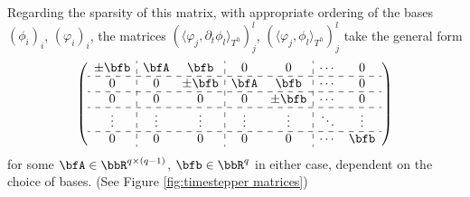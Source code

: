 \begin{example}
        Regarding the sparsity of this matrix, with appropriate ordering of the bases $(\phi_{i})_{i}$, $(\varphi_{i})_{i}$, the matrices $(\langle\varphi_{j}, \partial_{t}\phi_{l}\rangle_{T^{h}})_{j}^{l}$, $(\langle\varphi_{j}, \phi_{l}\rangle_{T^{h}})_{j}^{l}$ take the general form
        \begin{equation}\label{eqn:timestepper matrices}
            \left(\begin{array}{ c : c c : c c : c c }
                \pm\bfb  &  \bfA    &  \bfb     &  0       &  0        &  \cdots   &  0        \\
                \hdashline
                0        &  0       &  \pm\bfb  &  \bfA    &  \bfb     &  \cdots   &  0        \\
                \hdashline
                0        &  0       &  0        &  0       &  \pm\bfb  &  \cdots   &  0        \\
                \hdashline
                \vdots   &  \vdots  &  \vdots   &  \vdots  &  \vdots   &  \ddots   &  \vdots   \\
                \hdashline
                0        &  0       &  0        &  0       &  0        &  \cdots   &  \bfb     \\
            \end{array}\right)
        \end{equation}
        for some $\bfA  \in  \bbR^{q\times (q - 1)}$, $\bfb  \in  \bbR^{q}$ in either case, dependent on the choice of bases. (See Figure \ref{fig:timestepper matrices}) 


\end{example}
